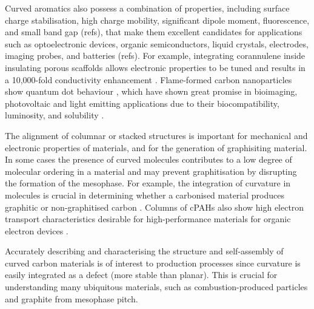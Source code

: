 Curved aromatics also possess a combination of properties, including surface charge stabilisation, high charge mobility, significant dipole moment, fluorescence, and small band gap (refs), that make them excellent candidates for applications such as optoelectronic devices, organic semiconductors, liquid crystals, electrodes, imaging probes, and batteries (refs). For example, integrating corannulene inside insulating porous scaffolds allows electronic properties to be tuned and results in a 10,000-fold conductivity enhancement \cite{rice2018stack}. Flame-formed carbon nanoparticles show quantum dot behaviour \cite{liu2019flame}, which have shown great promise in bioimaging, photovoltaic and light emitting applications due to their biocompatibility, luminosity, and solubility \cite{zhang2012graphene}.

The alignment of columnar or stacked structures is important for mechanical and electronic properties of materials, and for the generation of graphisiting material. In some cases the presence of curved molecules contributes to a low degree of molecular ordering in a material %
\cite{zhong2018structural} and may prevent graphitisation by disrupting the formation of the mesophase. For example, the integration of curvature in molecules is crucial in determining whether a carbonised material produces graphitic or non-graphitised carbon \cite{abrahamson2018carbon}. Columns of cPAHs also show high electron transport characteristics desirable for high-performance materials for organic electron devices \cite{wang2015electronic}.

Accurately describing and characterising the structure and self-assembly of curved carbon materials is of interest to production processes since curvature is easily integrated as a defect (more stable than planar). This is crucial for understanding many ubiquitous materials, such as combustion-produced particles and graphite from mesophase pitch.
%


